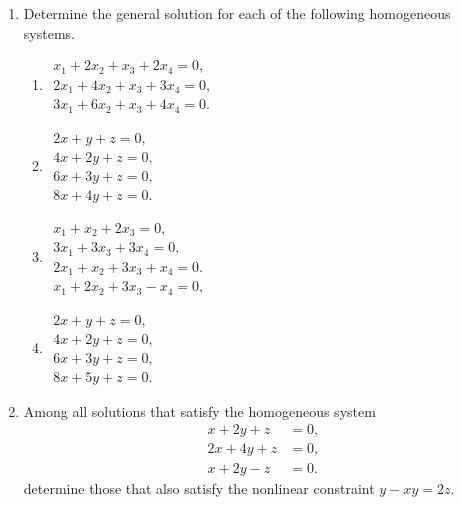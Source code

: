 \begin{enumerate}[leftmargin=*, label=\bfseries 2.4.\arabic*]

\item Determine the general solution for each of the following homogeneous systems.

\begin{enumerate}[label=(\alph*)]
    \item \(\begin{array}{l}
    x_1 + 2x_2 + x_3 + 2x_4 = 0, \\
    2x_1 + 4x_2 + x_3 + 3x_4 = 0, \\
    3x_1 + 6x_2 + x_3 + 4x_4 = 0.
    \end{array}\)
    
    \item \(\begin{array}{l}
    2x + y + z = 0, \\
    4x + 2y + z = 0, \\
    6x + 3y + z = 0, \\
    8x + 4y + z = 0.
    \end{array}\)
    
    \item \(\begin{array}{l}
    x_1 + x_2 + 2x_3 = 0, \\
    3x_1 + 3x_3 + 3x_4 = 0, \\
    2x_1 + x_2 + 3x_3 + x_4 = 0. \\
    x_1 + 2x_2 + 3x_3 - x_4 = 0,
    \end{array}\)

    \item \(\begin{array}{l}
    2x + y + z = 0, \\
    4x + 2y + z = 0, \\
    6x + 3y + z = 0, \\
    8x + 5y + z = 0.
    \end{array}\)
\end{enumerate}

\item Among all solutions that satisfy the homogeneous system
\[
\begin{aligned}
x + 2y + z &= 0, \\
2x + 4y + z &= 0, \\
x + 2y - z &=0.
\end{aligned}
\]
determine those that also satisfy the nonlinear constraint \(y - xy = 2z\).


\end{enumerate}
